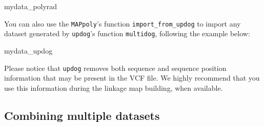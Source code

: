 \documentclass[
]{article}
\newenvironment{Shaded}{}{}
\newcommand{\CommentTok}[1]{\textcolor[rgb]{0.38,0.63,0.69}{\textit{#1}}}
\newcommand{\DataTypeTok}[1]{\textcolor[rgb]{0.56,0.13,0.00}{#1}}
\newcommand{\DecValTok}[1]{\textcolor[rgb]{0.25,0.63,0.44}{#1}}
\newcommand{\KeywordTok}[1]{\textcolor[rgb]{0.00,0.44,0.13}{\textbf{#1}}}
\newcommand{\NormalTok}[1]{#1}
\newcommand{\OperatorTok}[1]{\textcolor[rgb]{0.40,0.40,0.40}{#1}}
\newcommand{\StringTok}[1]{\textcolor[rgb]{0.25,0.44,0.63}{#1}}
\begin{document}
\begin{Shaded}
\begin{Highlighting}[]
\NormalTok{mydata_polyrad}
\end{Highlighting}
\end{Shaded}

You can also use the \texttt{MAPpoly}'s function
\texttt{import\_from\_updog} to import any dataset generated by
\texttt{updog}'s function \texttt{multidog}, following the example
below:

\begin{Shaded}
\end{Shaded}

\begin{Shaded}
\begin{Highlighting}[]
\NormalTok{mydata_updog}
\end{Highlighting}
\end{Shaded}

Please notice that \texttt{updog} removes both sequence and sequence
position information that may be present in the VCF file. We highly
recommend that you use this information during the linkage map building,
when available.

\hypertarget{combining-multiple-datasets}{%
\subsection{Combining multiple
datasets}\label{combining-multiple-datasets}}
\end{document}
